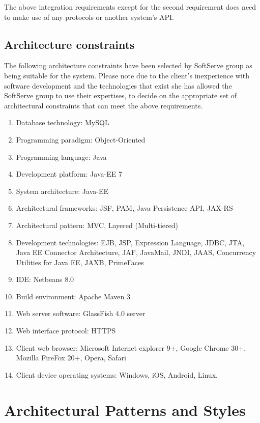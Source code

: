 \documentclass[12pt]{article}
\begin{document}
The above integration requirements except for the second requirement does need to make use of any protocols or another system's API.

\vspace{0.2in}

\subsection{Architecture constraints}
\vspace{0.2in}

The following architecture constraints have been selected by SoftServe group as being suitable for the system. Please note due to the client's inexperience with software development and the technologies that exist she has allowed the SoftServe group to use their expertises, to decide on the appropriate set of architectural constraints that can meet the above requirements.
\begin{enumerate}
\item Database technology: MySQL
\item Programming paradigm: Object-Oriented
\item Programming language: Java
\item Development platform: Java-EE 7 
\item System architecture: Java-EE
\item Architectural frameworks: JSF, PAM, Java Persistence API, JAX-RS
\item Architectural pattern: MVC, Layered (Multi-tiered)
\item Development technologies: EJB, JSP, Expression Language, JDBC, JTA, Java EE Connector Architecture, JAF, JavaMail, JNDI, JAAS, Concurrency Utilities for Java EE, JAXB, PrimeFaces
\item IDE: Netbeans 8.0
\item Build environment: Apache Maven 3
\item Web server software: GlassFish 4.0 server
\item Web interface protocol: HTTPS
\item Client web browser: Microsoft Internet explorer 9+, Google Chrome 30+, Mozilla FireFox 20+, Opera, Safari
\item Client device operating systems: Windows, iOS, Android, Linux. 
\end{enumerate}
\vspace{0.5in}


\section{Architectural Patterns and Styles} %
\end{document}
